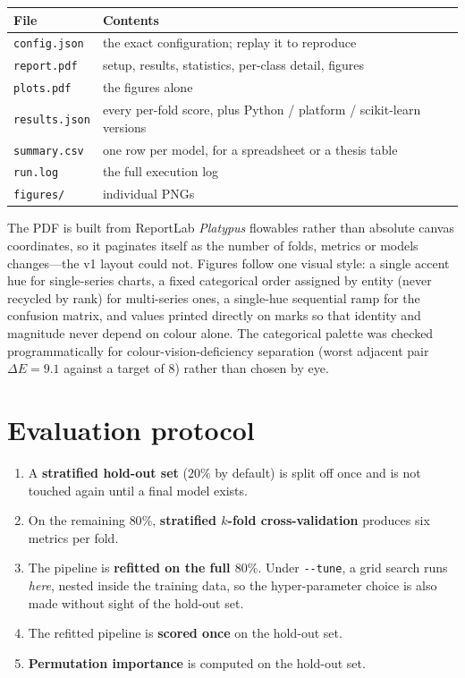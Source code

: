 \documentclass[11pt,a4paper]{article}
\begin{document}
\begin{center}
\begin{tabularx}{\textwidth}{L{3.2cm} X}
\toprule
\textbf{File} & \textbf{Contents} \\
\midrule
\texttt{config.json} & the exact configuration; replay it to reproduce \\
\texttt{report.pdf} & setup, results, statistics, per-class detail, figures \\
\texttt{plots.pdf} & the figures alone \\
\texttt{results.json} & every per-fold score, plus Python / platform / scikit-learn versions \\
\texttt{summary.csv} & one row per model, for a spreadsheet or a thesis table \\
\texttt{run.log} & the full execution log \\
\texttt{figures/} & individual PNGs \\
\bottomrule
\end{tabularx}
\end{center}

The PDF is built from ReportLab \emph{Platypus} flowables rather than absolute
canvas coordinates, so it paginates itself as the number of folds, metrics or
models changes---the v1 layout could not. Figures follow one visual style: a
single accent hue for single-series charts, a fixed categorical order assigned
by entity (never recycled by rank) for multi-series ones, a single-hue
sequential ramp for the confusion matrix, and values printed directly on marks
so that identity and magnitude never depend on colour alone. The categorical
palette was checked programmatically for colour-vision-deficiency separation
(worst adjacent pair $\Delta E = 9.1$ against a target of $8$) rather than
chosen by eye.

\section{Evaluation protocol}

\begin{enumerate}[leftmargin=1.6em,itemsep=0.3em]
  \item A \textbf{stratified hold-out set} ($20\%$ by default) is split off once and is not touched again until a final model exists.
  \item On the remaining $80\%$, \textbf{stratified $k$-fold cross-validation} produces six metrics per fold.
  \item The pipeline is \textbf{refitted on the full $80\%$}. Under \texttt{-{}-tune}, a grid search runs \emph{here}, nested inside the training data, so the hyper-parameter choice is also made without sight of the hold-out set.
  \item The refitted pipeline is \textbf{scored once} on the hold-out set.
  \item \textbf{Permutation importance} is computed on the hold-out set.
\end{enumerate}
\end{document}
